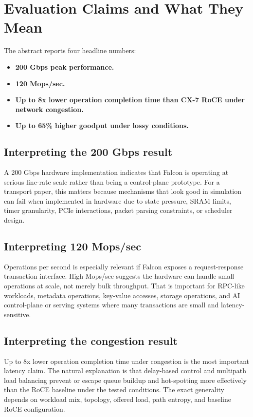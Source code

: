 \documentclass[11pt]{article}
\begin{document}
\section{Evaluation Claims and What They Mean}

The abstract reports four headline numbers:

\begin{itemize}
  \item \textbf{200 Gbps peak performance.}
  \item \textbf{120 Mops/sec.}
  \item \textbf{Up to 8x lower operation completion time than CX-7 RoCE under network congestion.}
  \item \textbf{Up to 65\% higher goodput under lossy conditions.}
\end{itemize}

\subsection{Interpreting the 200 Gbps result}

A 200 Gbps hardware implementation indicates that Falcon is operating at serious line-rate scale rather than being a control-plane prototype. For a transport paper, this matters because mechanisms that look good in simulation can fail when implemented in hardware due to state pressure, SRAM limits, timer granularity, PCIe interactions, packet parsing constraints, or scheduler design.

\subsection{Interpreting 120 Mops/sec}

Operations per second is especially relevant if Falcon exposes a request-response transaction interface. High Mops/sec suggests the hardware can handle small operations at scale, not merely bulk throughput. That is important for RPC-like workloads, metadata operations, key-value accesses, storage operations, and AI control-plane or serving systems where many transactions are small and latency-sensitive.

\subsection{Interpreting the congestion result}

Up to 8x lower operation completion time under congestion is the most important latency claim. The natural explanation is that delay-based control and multipath load balancing prevent or escape queue buildup and hot-spotting more effectively than the RoCE baseline under the tested conditions. The exact generality depends on workload mix, topology, offered load, path entropy, and baseline RoCE configuration.
\end{document}
